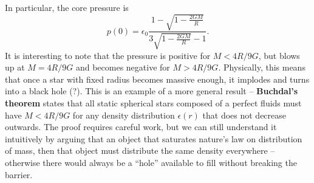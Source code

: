 In particular, the core pressure is
\begin{equation}
	p(0) = \epsilon_0 \frac{1 - \sqrt{1 - \frac{2GM}{R}}}{3 \sqrt{1-\frac{2GM}{R}} - 1} .
	\label{eq:incompressible_star:core_pressure}
\end{equation}
It is interesting to note that the pressure is positive for $M < 4R/9G$, but blows up at $M = 4R/9G$ and becomes negative for $M > 4R/9G$.
Physically, this means that once a star with fixed radius becomes massive enough, it implodes and turns into a black hole (?).
This is an example of a more general result -- \textbf{Buchdal's theorem} states that all static spherical stars composed of a perfect fluids must have $M < 4R/9G$ for any density distribution $\epsilon(r)$ that does not decrease outwards. \cite{ref:buchdal}
The proof requires careful work, but we can still understand it intuitively by arguing that an object that saturates nature's law on distribution of mass, then that object must distribute the same density everywhere -- otherwise there would always be a ``hole'' available to fill without breaking the barrier.

\iffalse
Let $\epsilon_0$ and $p_0$ be free variables.
Solving $p(0) = p_0$ and $M=\frac{4}{3} \pi R^3 \epsilon_0$ for $R$ and $M$, we get
\begin{equation}
	R = \sqrt{\frac{3}{4 \pi}} \sqrt{\frac{p_0}{(\epsilon_0 + 3 p_0) \epsilon_0 G}}
	\quad \text{and} \quad
	M = \frac{4}{3} \pi R^3 \epsilon_0
\end{equation}
\begin{equation}
	M(R) = -\frac{4 \pi R^3}{3} \frac{3 \sqrt{1-\frac{2GM}{R}} + 1}{\sqrt{1-\frac{2GM}{R}} + 1} p_0
\end{equation}
\fi

